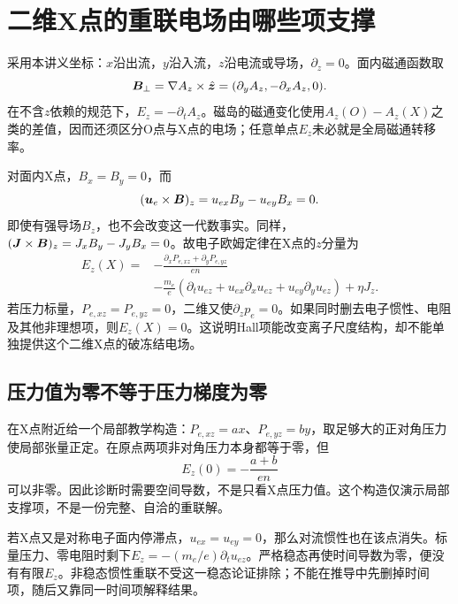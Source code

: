 \section{二维X点的重联电场由哪些项支撑}
采用本讲义坐标：$x$沿出流，$y$沿入流，$z$沿电流或导场，$\partial_z=0$。面内磁通函数取
\begin{equation}
\bm{B}_\perp=\nabla A_z\times\hat{\bm{z}}
=(\partial_yA_z,-\partial_xA_z,0).
\end{equation}
在不含$z$依赖的规范下，$E_z=-\partial_tA_z$。磁岛的磁通变化使用$A_z(O)-A_z(X)$之类的差值，因而还须区分O点与X点的电场；任意单点$E_z$未必就是全局磁通转移率。

对面内X点，$B_x=B_y=0$，而
\begin{equation}
(\bm{u}_e\times\bm{B})_z=u_{ex}B_y-u_{ey}B_x=0.
\end{equation}
即使有强导场$B_z$，也不会改变这一代数事实。同样，$(\bm{J}\times\bm{B})_z=J_xB_y-J_yB_x=0$。故电子欧姆定律在X点的$z$分量为
\begin{align}
E_z(X)={}&-\frac{\partial_xP_{e,xz}+\partial_yP_{e,yz}}{en}\nonumber\\
&-\frac{m_e}{e}\left(\partial_tu_{ez}
+u_{ex}\partial_xu_{ez}+u_{ey}\partial_yu_{ez}\right)
+\eta J_z.
\label{hall:eq:xpoint-ez}
\end{align}
若压力标量，$P_{e,xz}=P_{e,yz}=0$，二维又使$\partial_zp_e=0$。如果同时删去电子惯性、电阻及其他非理想项，则$E_z(X)=0$。这说明Hall项能改变离子尺度结构，却不能单独提供这个二维X点的破冻结电场。\citep{Wang2015}

\subsection{压力值为零不等于压力梯度为零}
在X点附近给一个局部教学构造：$P_{e,xz}=ax$、$P_{e,yz}=by$，取足够大的正对角压力使局部张量正定。在原点两项非对角压力本身都等于零，但
\begin{equation}
E_z(0)=-\frac{a+b}{en}
\end{equation}
可以非零。因此诊断时需要空间导数，不是只看X点压力值。这个构造仅演示局部支撑项，不是一份完整、自洽的重联解。

若X点又是对称电子面内停滞点，$u_{ex}=u_{ey}=0$，那么对流惯性也在该点消失。标量压力、零电阻时剩下$E_z=-(m_e/e)\partial_tu_{ez}$。严格稳态再使时间导数为零，便没有有限$E_z$。非稳态惯性重联不受这一稳态论证排除；不能在推导中先删掉时间项，随后又靠同一时间项解释结果。

